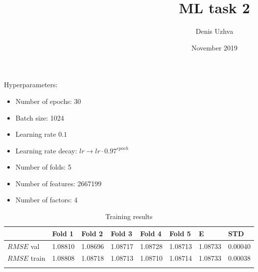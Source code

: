 \documentclass{article}
\begin{document}
\title{ML task 2}
\author{Denis Uzhva}
\date{November 2019}
\maketitle

Hyperparameters:
\begin{itemize}
	\item Number of epochs: 30
	\item Batch size: 1024
	\item Learning rate $0.1$
	\item Learning rate decay: $lr \rightarrow lr \cdot 0.97^{epoch}$
	\item Number of folds: 5
	\item Number of features: 2667199
	\item Number of factors: 4
\end{itemize}

\begin{longtable}{llllllll}
	\toprule
		&	Fold 1  &   Fold 2 & Fold 3  & Fold 4 & Fold 5   & E & STD   \\
	\midrule
		$RMSE$ val	&	1.08810	&	1.08696	&	1.08717	&	1.08728	&	1.08713	&	1.08733	&	0.00040	\\
		$RMSE$ train	&	1.08808	&	1.08718	&	1.08713	&	1.08710	&	1.08714	&	1.08733	&	0.00038	\\    	\bottomrule
	\caption{Training results}
	\label{tab:acc}
\end{longtable}
\end{document}
